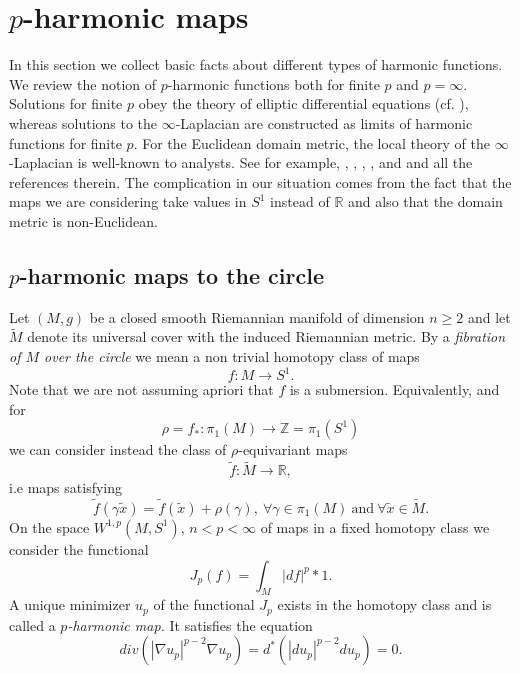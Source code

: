 \documentclass{ip-journal}
\theoremstyle{definition}
\numberwithin{equation}{section}
\newcommand{\R}{\mathbb R}
\newcommand{\Z}{\mathbb Z}
\begin{document}
\section{$p$-harmonic maps}\label{sect:pharmmaps}
In this section we collect basic facts about different types of harmonic functions. We review the notion of $p$-harmonic functions both for finite $p$ and $p=\infty$. Solutions for finite $p$ obey the theory of elliptic differential equations (cf. \cite{uhlen}), whereas  solutions  to the $\infty$-Laplacian are constructed as limits of  harmonic functions for finite $p$. For the Euclidean domain metric, the local theory of the $\infty$-Laplacian is well-known to analysts. See for example, \cite{arcrju}, \cite{crandal}, \cite{jensen}, \cite{evans-savin}, \cite{evans-smart} and \cite{lindqvist} and all the references therein. The complication in our situation comes from the fact that the maps we are considering take values in $S^1$ instead of $\R$ and also that the domain metric is non-Euclidean. 

\subsection{$p$-harmonic maps to the circle} Let $(M, g)$ be a closed  smooth Riemannian manifold  of dimension $n \geq 2$ and let $\tilde M$ denote its universal cover with the induced Riemannian metric. By a {\it {  fibration of $M$ over the circle}} we mean a non trivial homotopy class of maps   
\[
f: M \rightarrow S^1.
\]
Note that we are not assuming apriori that $f$ is a submersion.
Equivalently, and for
\[
\rho=f_*:\pi_1(M) \rightarrow \Z=\pi_1(S^1)
\]
we can consider instead the class of $\rho$-equivariant maps
\[
\tilde f: \tilde M \rightarrow \R,
\]
i.e maps satisfying
\begin{equation*}\label{equiccmd}
\tilde f(\gamma \tilde x)=  \tilde f( \tilde x)+ \rho(\gamma), \ \forall \gamma \in \pi_1(M)\  \mbox{and} \   \forall \tilde x \in \tilde M.
\end{equation*}
On the space 
 $W^{1,p}(M, S^1)$, $n<p< \infty$ of maps in a fixed  homotopy class 
 we consider the functional
\begin{equation}\label{pharmfun}
J_p(f)=\int_M|df|^p *1.
\end{equation}
 A unique minimizer $u_p$ of the functional $J_p$ exists in the homotopy class and is 
 called a {\it{$p$-harmonic map.}} It satisfies the equation
\begin{equation}\label{pharm}
div(|\nabla u_p|^{p-2}\nabla u_p)=d^*(|du_p|^{p-2}du_p)=0.
\end{equation}
\end{document}
